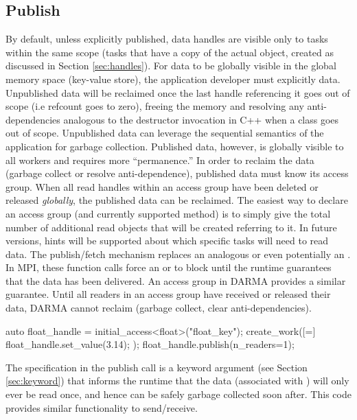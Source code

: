 \subsection{Publish}
\label{subsec:publish}
By default, unless explicitly published, data handles are visible only to tasks
within the same scope (tasks that have a copy of the actual
\ahandleT object, created as discussed in
Section \ref{sec:handles}).
For data to be globally visible in the global memory space (key-value store),
the application developer must explicitly  data.  
Unpublished data will be reclaimed once the last handle referencing it goes out of scope (i.e refcount goes to zero),
freeing the memory and resolving any anti-dependencies analogous to the
destructor invocation in C++ when a class goes out of scope.  
Unpublished data can leverage the sequential semantics of the application for garbage collection.  
Published data, however, is globally visible to all workers and requires more ``permanence.''  
In order to reclaim the data (garbage collect or resolve anti-dependence), published data must know its access group.
When all read handles within an access group have been deleted or released \emph{globally}, the published data can be reclaimed.
The easiest way to declare an access group (and currently supported method) is
to simply give the total number of additional read \ahandleT objects that will be created referring to it.
In future versions, hints will be supported about which specific tasks will need to read data.
The publish/\gls{fetch} mechanism replaces an analogous  or even potentially an .
In MPI, these function calls force an  or  to block until the runtime guarantees that the data has been delivered.
An access group in DARMA provides a similar guarantee.
Until all readers in an access group have received or released their data, DARMA cannot reclaim (garbage collect, clear anti-dependencies).

\begin{CppCode}
auto float_handle = initial_access<float>("float_key");
create_work([=]{
  float_handle.set_value(3.14);
});
float_handle.publish(n_readers=1);
\end{CppCode}
The  specification in the publish call is a keyword
argument (see Section \ref{sec:keyword}) that informs the runtime that the data
(associated with ) will only ever be read once, and hence can be safely garbage collected soon after.  
This code provides similar functionality to send/receive.

